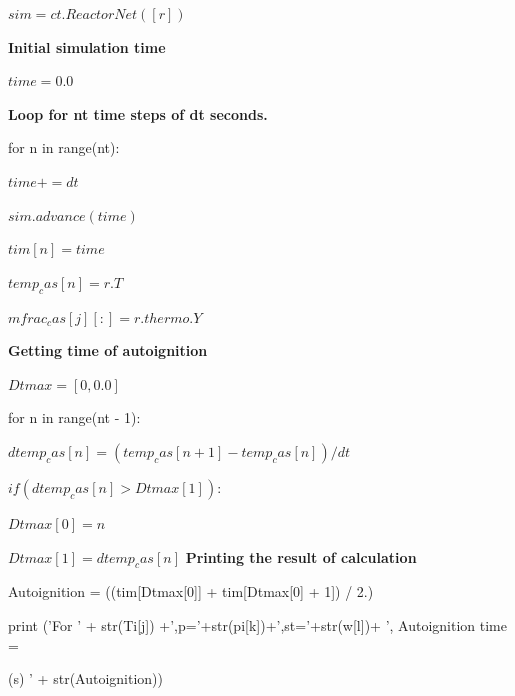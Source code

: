 \documentclass[a4paper]{article}
\begin{document}
\hspace{16,05mm}$ sim = ct.ReactorNet([r])$
           
\hspace{16,05mm}\textbf{Initial simulation time}
   
\hspace{16,05mm}$time = 0.0$
            
\hspace{16,05mm}\textbf{Loop for nt time steps of dt seconds.}
    
\hspace{16,05mm}for n in range(nt):
            
\hspace{21,40mm}$time += dt$
                
\hspace{21,40mm}$sim.advance(time)$
                
\hspace{21,40mm}$tim[n] = time$
                
\hspace{21,40mm}$temp_cas[n] = r.T$
                
\hspace{21,40mm}$mfrac_cas[j][:] = r.thermo.Y$

\textbf{Getting time of autoignition}

\hspace{16,05mm}$Dtmax = [0, 0.0]$

\hspace{16,05mm}for n in range(nt - 1):

\hspace{21,40mm}$dtemp_cas[n] = (temp_cas[n + 1] - temp_cas[n]) / dt$
 
\hspace{21,40mm}$if (dtemp_cas[n] > Dtmax[1]):$

\hspace{26,75mm}$Dtmax[0] = n$

\hspace{26,75mm}$Dtmax[1] = dtemp_cas[n]$
\textbf{Printing the result of calculation}

\hspace{16,05mm}Autoignition     = ((tim[Dtmax[0]] + tim[Dtmax[0] + 1]) / 2.)

\hspace{16,05mm}print ('For ' + str(Ti[j]) +',p='+str(pi[k])+',st='+str(w[l])+ ', Autoignition time =

\hspace{16,05mm}(s) ' + str(Autoignition))
\end{document}
